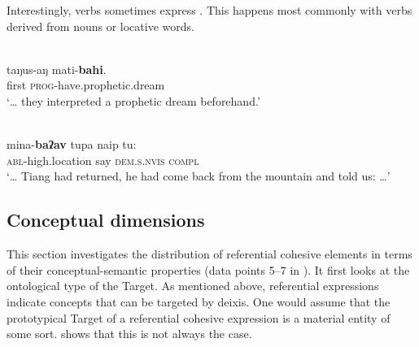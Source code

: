 \documentclass[output=paper
,modfonts
,nonflat]{langsci/langscibook}
\begin{document}
Interestingly, verbs sometimes express . This happens most commonly with verbs derived from nouns or locative words.

\begin{exe}
	\label{e6}\\
	\gll taŋus-aŋ  mati-\textbf{bahi}.\\
	first  \textsc{prog}-have.prophetic.dream\\
	\glt ‘‎‎… they interpreted a prophetic dream beforehand.’
\end{exe}

\begin{exe}
	\label{e7}\\
	\gll mina-\textbf{baʔav}  tupa  naip  tu:\\
	\textsc{abl}-high.location  say  \textsc{dem}.\textsc{s}.\textsc{nvis}  \textsc{compl}\\
	\glt ‘… Tiang had returned, he had come back from the mountain and told us: …’
\end{exe}

\subsection{\label{s3.2}Conceptual dimensions}

This section investigates the distribution of referential cohesive elements in terms of their conceptual-semantic properties (data points 5--7 in ). It first looks at the ontological type of the Target. As mentioned above, referential expressions indicate concepts that can be targeted by deixis. One would assume that the prototypical Target of a referential cohesive expression is a material entity of some sort.  shows that this is not always the case. 
\end{document}

